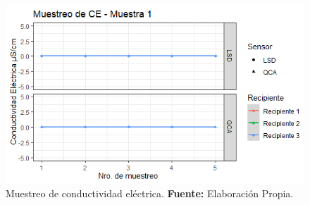     \begin{figure}[H]
        \centering
        \includegraphics[width=0.75\linewidth]{Imagenes/cap4/CE_M1.png}
        \caption {Muestreo de conductividad el\'ectrica. \textbf{Fuente:}
        Elaboraci\'on Propia. }
        \label{fig:M1CE}
    \end{figure}

